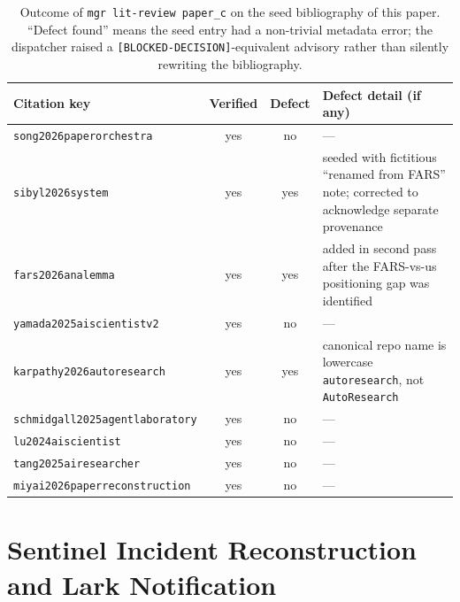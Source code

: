 \begin{table}[t]
  \caption{Outcome of \texttt{mgr lit-review paper\_c} on the seed
    bibliography of this paper. ``Defect found'' means the seed entry
    had a non-trivial metadata error; the dispatcher raised a
    \texttt{[BLOCKED-DECISION]}-equivalent advisory rather than
    silently rewriting the bibliography.}
  \label{tab:litreview}
  \centering
  \footnotesize
  \begin{tabular}{l c c p{}}
    \toprule
    \textbf{Citation key} & \textbf{Verified} & \textbf{Defect} & \textbf{Defect detail (if any)} \\
    \midrule
    \texttt{song2026paperorchestra}        & yes & no  & --- \\
    \texttt{sibyl2026system}               & yes & yes & seeded with fictitious ``renamed from FARS'' note; corrected to acknowledge separate provenance \\
    \texttt{fars2026analemma}              & yes & yes & added in second pass after the FARS-vs-us positioning gap was identified \\
    \texttt{yamada2025aiscientistv2}       & yes & no  & --- \\
    \texttt{karpathy2026autoresearch}      & yes & yes & canonical repo name is lowercase \texttt{autoresearch}, not \texttt{AutoResearch} \\
    \texttt{schmidgall2025agentlaboratory} & yes & no  & --- \\
    \texttt{lu2024aiscientist}             & yes & no  & --- \\
    \texttt{tang2025airesearcher}          & yes & no  & --- \\
    \texttt{miyai2026paperreconstruction}  & yes & no  & --- \\
    \bottomrule
  \end{tabular}
\end{table}

\section{Sentinel Incident Reconstruction and Lark Notification}
\label{app:sentinel-msg}

